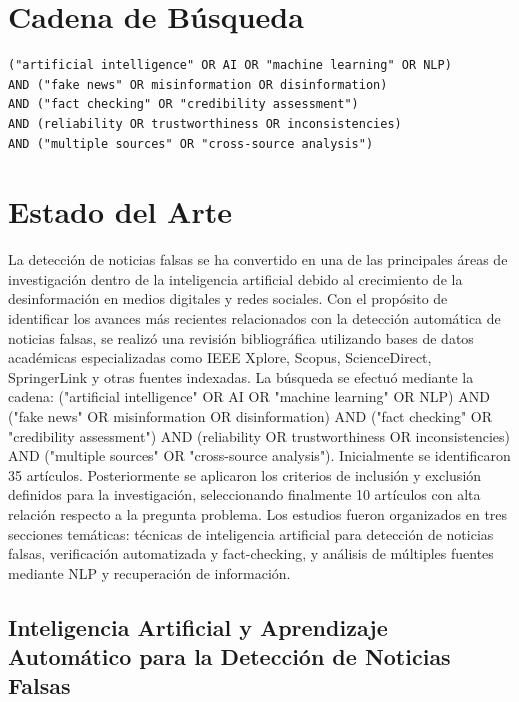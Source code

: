 \documentclass[12pt]{article}
\begin{document}
\section{Cadena de Búsqueda}

\begin{verbatim}
("artificial intelligence" OR AI OR "machine learning" OR NLP)
AND ("fake news" OR misinformation OR disinformation)
AND ("fact checking" OR "credibility assessment")
AND (reliability OR trustworthiness OR inconsistencies)
AND ("multiple sources" OR "cross-source analysis")
\end{verbatim}

\section{Estado del Arte}

La detección de noticias falsas se ha convertido en una de las principales áreas de investigación dentro de la inteligencia artificial debido al crecimiento de la desinformación en medios digitales y redes sociales. Con el propósito de identificar los avances más recientes relacionados con la detección automática de noticias falsas, se realizó una revisión bibliográfica utilizando bases de datos académicas especializadas como IEEE Xplore, Scopus, ScienceDirect, SpringerLink y otras fuentes indexadas. La búsqueda se efectuó mediante la cadena: ("artificial intelligence" OR AI OR "machine learning" OR NLP) AND ("fake news" OR misinformation OR disinformation) AND ("fact checking" OR "credibility assessment") AND (reliability OR trustworthiness OR inconsistencies) AND ("multiple sources" OR "cross-source analysis"). Inicialmente se identificaron 35 artículos. Posteriormente se aplicaron los criterios de inclusión y exclusión definidos para la investigación, seleccionando finalmente 10 artículos con alta relación respecto a la pregunta problema. Los estudios fueron organizados en tres secciones temáticas: técnicas de inteligencia artificial para detección de noticias falsas, verificación automatizada y fact-checking, y análisis de múltiples fuentes mediante NLP y recuperación de información.

\subsection*{Inteligencia Artificial y Aprendizaje Automático para la Detección de Noticias Falsas}
\end{document}
